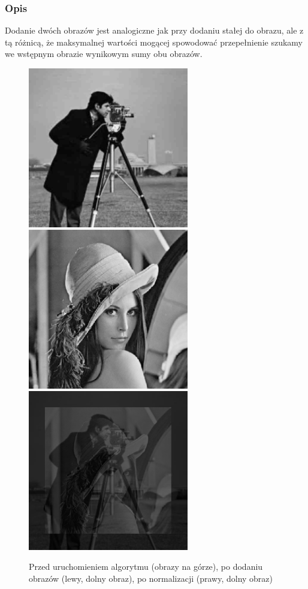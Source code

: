 \documentclass[a4paper,12pt]{book}
\begin{document}
\subsubsection*{Opis}
Dodanie dwóch obrazów jest analogiczne jak przy dodaniu stałej do obrazu, ale z tą różnicą, że maksymalnej wartości mogącej spowodować przepełnienie szukamy we wstępnym obrazie wynikowym sumy obu obrazów. 

\begin{figure}[H]
	\caption{Przed uruchomieniem algorytmu (obrazy na górze), po dodaniu obrazów (lewy, dolny obraz), po normalizacji (prawy, dolny obraz)}
	\includegraphics[width=7cm, height=7cm]{man-unmodified.jpg}
	\includegraphics[width=7cm, height=7cm]{lena-unmodified.png}
	\includegraphics[width=7cm, height=7cm]{2/sum-gray-images.png}

\end{figure}
\end{document}
